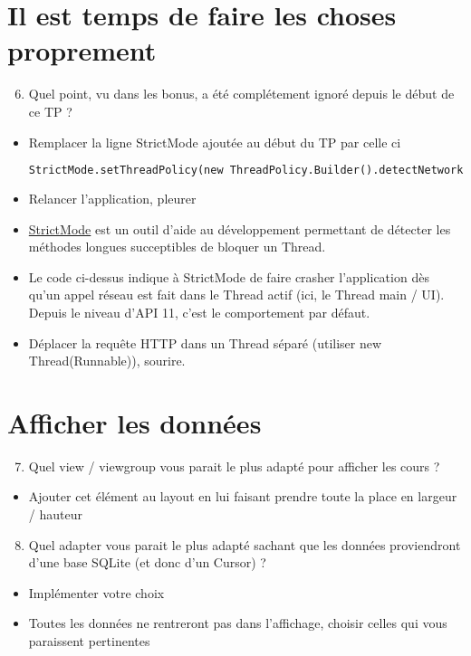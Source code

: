 \documentclass{article}
\begin{document}
\section{Il est temps de faire les choses proprement}
\begin{enumerate}
 \setcounter{enumi}{5}
\item Quel point, vu dans les bonus, a été complétement ignoré depuis le début de ce TP ?
\end{enumerate}
\begin{itemize}
  \item Remplacer la ligne StrictMode ajoutée au début du TP par celle ci
 \begin{lstlisting}[language=XML]
 StrictMode.setThreadPolicy(new ThreadPolicy.Builder().detectNetwork().penaltyDeathOnNetwork().build());
\end{lstlisting} 
  \item Relancer l'application, pleurer
  \item
  \href{http://developer.android.com/reference/android/os/StrictMode.html}{StrictMode}
  est un outil d'aide au développement permettant de détecter les méthodes
  longues succeptibles de bloquer un Thread.
  \item Le code ci-dessus indique à StrictMode de faire crasher l'application
  dès qu'un appel réseau est fait dans le Thread actif (ici, le Thread main /
  UI). Depuis le niveau d'API 11, c'est le comportement par défaut.
  \item Déplacer la requête HTTP dans un Thread séparé (utiliser new
  Thread(Runnable)), sourire.
\end{itemize}
\section{Afficher les données}
\begin{enumerate}
 \setcounter{enumi}{6}
\item Quel view / viewgroup vous parait le plus adapté pour afficher les cours ?
\end{enumerate}
\begin{itemize} 
  \item Ajouter cet élément au layout en lui faisant prendre toute la place en
  largeur / hauteur
\end{itemize}
\begin{enumerate}
 \setcounter{enumi}{7}
\item Quel adapter vous parait le plus adapté sachant que les données proviendront d'une base SQLite (et donc d'un Cursor) ?
\end{enumerate}
\begin{itemize} 
  \item Implémenter votre choix
  \item Toutes les données ne rentreront pas dans l'affichage, choisir celles
  qui vous paraissent pertinentes
\end{itemize}
\end{document}
